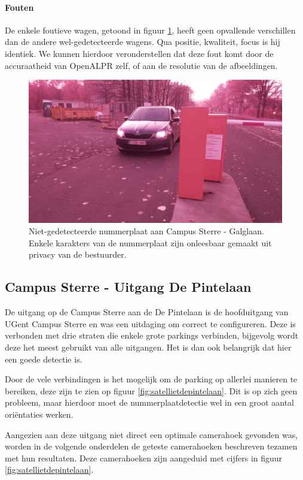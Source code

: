 \paragraph{Fouten}
De enkele foutieve wagen, getoond in figuur \ref{foutiefgalglaan}, heeft geen opvallende verschillen dan de andere wel-gedetecteerde wagens. Qua positie, kwaliteit, focus is hij identiek. We kunnen hierdoor veronderstellen dat deze fout komt door de accuraatheid van OpenALPR zelf, of aan de resolutie van de afbeeldingen.
\begin{figure}[h!]
	\centering
	\includegraphics[width=0.5\linewidth]{img/res-galglaan/galg1.jpg}
	\caption{Niet-gedetecteerde nummerplaat aan Campus Sterre - Galglaan. Enkele karakters van de nummerplaat zijn onleesbaar gemaakt uit privacy van de bestuurder.}
	\label{foutiefgalglaan}
\end{figure}

\subsection{Campus Sterre - Uitgang De Pintelaan}
De uitgang op de Campus Sterre aan de De Pintelaan is de hoofduitgang van UGent Campus Sterre en was een uitdaging om correct te configureren. Deze is verbonden met drie straten die enkele grote parkings verbinden, bijgevolg wordt deze het meest gebruikt van alle uitgangen. Het is dan ook belangrijk dat hier een goede detectie is.

Door de vele verbindingen is het mogelijk om de parking op allerlei manieren te bereiken, deze zijn te zien op figuur \ref{fig:satellietdepintelaan}. Dit is op zich geen probleem, maar hierdoor moet de nummerplaatdetectie wel in een groot aantal oriëntaties werken.

Aangezien aan deze uitgang niet direct een optimale camerahoek gevonden was, worden in de volgende onderdelen de geteste camerahoeken beschreven tezamen met hun resultaten. Deze camerahoeken zijn aangeduid met cijfers in figuur \ref{fig:satellietdepintelaan}.

